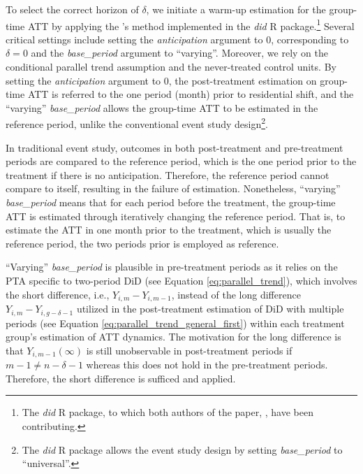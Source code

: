 To select the correct horizon of $\delta$, we initiate a warm-up estimation for the group-time ATT by applying the \cite{callaway2021difference}'s method implemented in the \textit{did} R package.\footnote{The \textit{did} R package, to which both authors of the paper, \cite{callaway2021difference}, have been contributing.}
Several critical settings include setting the \textit{anticipation} argument to 0, corresponding to $\delta = 0$ and the \textit{base\_period} argument to ``varying''. Moreover, we rely on the conditional parallel trend assumption and the never-treated control units.
By setting the \textit{anticipation} argument to 0, the post-treatment estimation on group-time ATT is referred to the one period (month) prior to residential shift, and the ``varying'' \textit{base\_period} allows the group-time ATT to be estimated in the reference period, unlike the conventional event study design\footnote{The \textit{did} R package allows the event study design by setting \textit{base\_period} to ``universal''.}.

In traditional event study, outcomes in both post-treatment and pre-treatment periods are compared to the reference period, which is the one period prior to the treatment if there is no anticipation.
Therefore, the reference period cannot compare to itself, resulting in the failure of estimation.
Nonetheless, ``varying'' \textit{base\_period} means that for each period before the treatment, the group-time ATT is estimated through iteratively changing the reference period.
That is, to estimate the ATT in one month prior to the treatment, which is usually the reference period, the two periods prior is employed as reference.

``Varying'' \textit{base\_period} is plausible in pre-treatment periods as it relies on the PTA specific to two-period DiD (see Equation \ref{eq:parallel_trend}), which involves the short difference, i.e., $Y_{i, m} - Y_{i, m-1}$, instead of the long difference $Y_{i, m} - Y_{i, g-\delta-1}$ utilized in the post-treatment estimation of DiD with multiple periods (see Equation \ref{eq:parallel_trend_general_first}) within each treatment group's estimation of ATT dynamics.
The motivation for the long difference is that \( Y_{i, m-1}(\infty) \) is still unobservable in post-treatment periods if \( m-1 \neq n-\delta-1 \) whereas this does not hold in the pre-treatment periods.
Therefore, the short difference is sufficed and applied.

